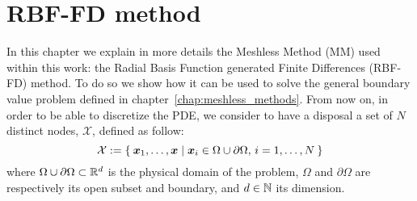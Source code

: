 \chapter{RBF-FD method}

In this chapter we explain in more details the Meshless Method (MM) used within this work: the Radial Basis Function generated Finite Differences (RBF-FD) method.
To do so we show how it can be used to solve the general boundary value problem defined in chapter~\vref{chap:meshless_methods}.
From now on, in order to be able to discretize the PDE, we consider to have a disposal a set of $N$ distinct nodes, $\mathcal{X}$, defined as follow:
\begin{equation}
\label{eqn:generic_set_of_nodes_X}
	\mathcal{X} := \Set{\boldsymbol{x}_1, \dots, \boldsymbol{x} \mid \boldsymbol{x}_i \in \Omega\cup\partial\Omega, \, i=1, \dots, N}
\end{equation}
where $\Omega\cup\partial\Omega \subset \mathbb{R}^d$ is the physical domain of the problem, $\Omega$ and $\partial\Omega$ are respectively its open subset and boundary, and $d \in \mathbb{N}$ its dimension.


%
%

